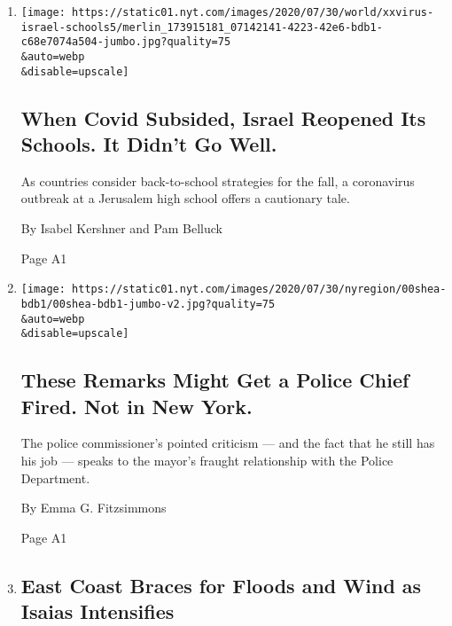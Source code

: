 \begin{enumerate}
\def\labelenumi{\arabic{enumi}.}
\item
  \href{/2020/08/04/world/middleeast/coronavirus-israel-schools-reopen.html}{}

  \texttt{[image: https://static01.nyt.com/images/2020/07/30/world/xxvirus-israel-schools5/merlin\_173915181\_07142141-4223-42e6-bdb1-c68e7074a504-jumbo.jpg?quality=75\\\&auto=webp\\\&disable=upscale]}

  \hypertarget{when-covid-subsided-israel-reopened-its-schools-it-didnt-go-well}{%
  \subsection{When Covid Subsided, Israel Reopened Its Schools. It
  Didn't Go
  Well.}\label{when-covid-subsided-israel-reopened-its-schools-it-didnt-go-well}}

  As countries consider back-to-school strategies for the fall, a
  coronavirus outbreak at a Jerusalem high school offers a cautionary
  tale.

  By Isabel Kershner and Pam Belluck

  Page A1
\item
  \href{/2020/08/03/nyregion/police-shea-de-blasio-nyc.html}{}

  \texttt{[image: https://static01.nyt.com/images/2020/07/30/nyregion/00shea-bdb1/00shea-bdb1-jumbo-v2.jpg?quality=75\\\&auto=webp\\\&disable=upscale]}

  \hypertarget{these-remarks-might-get-a-police-chief-fired-not-in-new-york}{%
  \subsection{These Remarks Might Get a Police Chief Fired. Not in New
  York.}\label{these-remarks-might-get-a-police-chief-fired-not-in-new-york}}

  The police commissioner's pointed criticism --- and the fact that he
  still has his job --- speaks to the mayor's fraught relationship with
  the Police Department.

  By Emma G. Fitzsimmons

  Page A1
\item
  \href{/2020/08/03/us/isaias-east-coast-landfall.html}{}

  \hypertarget{east-coast-braces-for-floods-and-wind-as-isaias-intensifies}{%
  \subsection{East Coast Braces for Floods and Wind as Isaias
  Intensifies}\label{east-coast-braces-for-floods-and-wind-as-isaias-intensifies}}


\end{enumerate}
